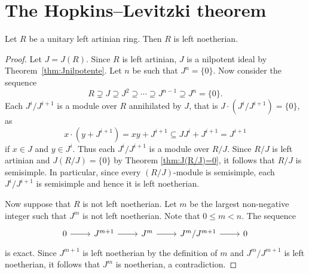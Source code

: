 


\section{The Hopkins--Levitzki theorem}

\begin{theorem}
	\label{thm:Hopkins-Levitzki}
	Let $R$ be a unitary left artinian ring. Then $R$ is left noetherian.
\end{theorem}

\begin{proof}
	Let $J=J(R)$. Since $R$ is left artinian, $J$ is a nilpotent ideal 
	by Theorem~\ref{thm:Jnilpotente}. Let $n$ be such that $J^n=\{0\}$. Now consider the sequence 
	\[
		R\supsetneq J\supseteq J^2\supseteq\cdots\supseteq J^{n-1}\supseteq J^n=\{0\}.
	\]
	Each $J^{i}/J^{i+1}$ is a module over $R$ annihilated by $J$, 
	that is $J\cdot (J^i/J^{i+1})=\{0\}$, as 
	\[
	x\cdot (y+J^{i+1})=xy+J^{i+1}\subseteq JJ^i+J^{i+1}=J^{i+1} 
	\]
	if $x\in J$ and $y\in J^i$. 
	Thus each  
	$J^i/J^{i+1}$ is a module over $R/J$. Since $R/J$ is left artinian and 
	$J(R/J)=\{0\}$ by Theorem \ref{thm:J(R/J)=0}, it follows that $R/J$ is semisimple. 
	In particular, since every $(R/J)$-module is semisimple,  
	each $J^{i}/J^{i+1}$ 
	is semisimple and hence it is left noetherian. 
	
	Now suppose that $R$ is not left noetherian. Let $m$ be the largest non-negative integer
	such that $J^m$ is not left noetherian. Note that $0\leq m<n$. The sequence
	\[
	 \begin{tikzcd}
        0 & J^{m+1} & J^m & J^{m}/J^{m+1} & 0
        \arrow[from=1-1, to=1-2]
        \arrow[from=1-2, to=1-3]
        \arrow[from=1-3, to=1-4]
        \arrow[from=1-4, to=1-5]
    \end{tikzcd}
	\]
	is exact. Since $J^{m+1}$ is left noetherian by the definition of $m$ 
	and $J^m/J^{m+1}$ is left noetherian, it follows that 
	$J^m$ is noetherian, a contradiction. 
\end{proof}

